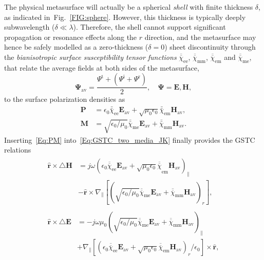 \documentclass[journal,transaction]{IEEEtran}
\newcommand{\figref}{Fig.~\ref}
\newcommand{\ve}[1]{\mathbf{#1}}
\newcommand{\uve}[1]{\mathbf{\hat{#1}}}
\newcommand{\ves}[1]{\boldsymbol{#1}}
\newcommand{\te}[1]{\overline{\overline{#1}}}
\begin{document}
The physical metasurface will actually be a spherical \emph{shell} with finite thickness $\delta$, as indicated in~\figref{FIG:sphere}. However, this thickness is typically deeply subwavelength ($\delta\ll\lambda$). Therefore, the shell cannot support significant propagation or resonance effects along the $r$ direction, and the metasurface may hence be safely modelled as a zero-thickness ($\delta=0$) sheet discontinuity through the \emph{bianisotropic surface susceptibility tensor functions} $\te{\chi}_\text{ee}$, $\te{\chi}_\text{mm}$, $\te{\chi}_\text{em}$ and $\te{\chi}_\text{me}$, that relate the average fields at both sides of the metasurface,
%
\begin{equation}\label{Eq:av_fields}
\ves{\Psi}_\text{av}
=\frac{\Psi^\text{t}+(\Psi^\text{i}+\Psi^\text{r})}{2},
\quad
\ves{\Psi}=\ve{E},\ve{H},
\end{equation}
%
to the surface polarization densities as~\cite{synthesis_planar_KA2015}
%
\begin{subequations}\label{Eq:PM}
\begin{align}
 \ve{P}&=\epsilon_0\bar{\bar{\chi}}_\text{ee}\ve{E}_\text{av}+\sqrt{\mu_0\epsilon_0}\bar{\bar{\chi}}_\text{em}\ve{H}_\text{av},\\
 \ve{M}&=\sqrt{\epsilon_0/\mu_0}\bar{\bar{\chi}}_\text{me}\ve{E}_\text{av}+\bar{\bar{\chi}}_\text{mm}\ve{H}_\text{av}.
\end{align}
\end{subequations}
%
Inserting~\eqref{Eq:PM} into~\eqref{Eq:GSTC_two_media_JK} finally provides the GSTC relations
%
\begin{subequations}\label{Eq:gstcdeltaav}
\begin{align}
\begin{split}
\uve{r}\times\triangle\ve{H}&=j\omega({\epsilon_0\te{\chi}_\text{ee}\ve{E}_\text{av}+\sqrt{\mu_0\epsilon_0}\te\chi}_\text{em}\ve{H}_\text{av})_\|\\
&-\uve{r}\times\nabla_{\|}[(\sqrt{\epsilon_0/\mu_0}\te{\chi}_\text{me}\ve{E}_\text{av}+\te{\chi}_\text{mm}\ve{H}_\text{av})_r],
\end{split}\\
\begin{split}
\uve{r}\times\triangle\ve{E}&=-j\omega\mu_0(\sqrt{\epsilon_0/\mu_0}\te{\chi}_\text{me}\ve{E}_\text{av}+\te{\chi}_\text{mm}\ve{H}_\text{av})_\|\\
&+\nabla_{\|}[(\epsilon_0\te{\chi}_\text{ee}\ve{E}_\text{av}+\sqrt{\mu_0\epsilon_0}\te{\chi}_\text{em}\ve{H}_\text{av})_r/\epsilon_0]\times\uve{r},
\end{split}
\end{align}
\end{subequations}
\end{document}
